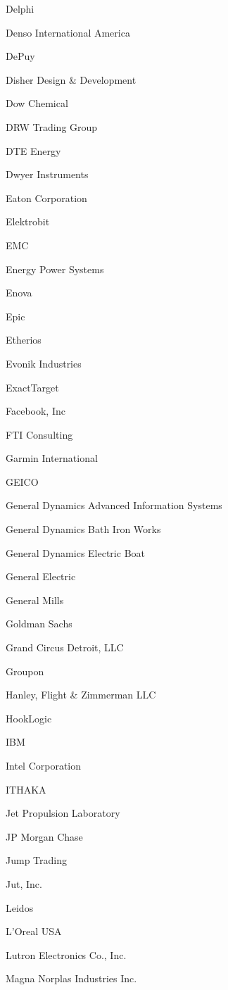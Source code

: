 \documentclass[twoside]{article}
\begin{document}
\begin{center}
\begin{multicols}{5}
\begin{FlushLeft}
\begin{compactitem}
\item Delphi
\item Denso International America
\item DePuy
\item Disher Design \& Development
\item Dow Chemical
\item DRW Trading Group
\item DTE Energy
\item Dwyer Instruments
\item Eaton Corporation
\item Elektrobit
\item EMC
\item Energy Power Systems
\item Enova
\item Epic
\item Etherios
\item Evonik Industries
\item ExactTarget
\item Facebook, Inc
\item FTI Consulting
\item Garmin International
\item GEICO
\item General Dynamics Advanced Information Systems
\item General Dynamics Bath Iron Works
\item General Dynamics Electric Boat
\item General Electric
\item General Mills
\item Goldman Sachs
\item Grand Circus Detroit, LLC
\item Groupon
\item Hanley, Flight \& Zimmerman LLC
\item HookLogic
\item IBM
\item Intel Corporation
\item ITHAKA
\item Jet Propulsion Laboratory
\item JP Morgan Chase
\item Jump Trading
\item Jut, Inc.
\item Leidos
\item L'Oreal USA
\item Lutron Electronics Co., Inc.
\item Magna Norplas Industries Inc.

\end{compactitem}
\end{FlushLeft}
\end{multicols}
\end{center}
\end{document}
